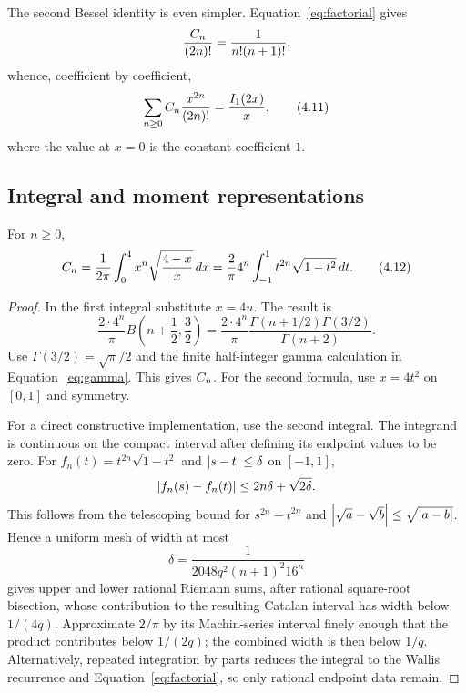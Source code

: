 The second Bessel identity is even simpler.  Equation~\eqref{eq:factorial}
gives
\[
 \frac{C_n}{(2n)!}=\frac1{n!(n+1)!},
\]
whence, coefficient by coefficient,
\[
 \sum_{n\ge0}C_n\frac{x^{2n}}{(2n)!}
 =\frac{I_1(2x)}x,                                                \tag{4.11}\label{eq:even-egf}
\]
where the value at $x=0$ is the constant coefficient $1$.

\subsection{Integral and moment representations}

\begin{theorem}
For $n\ge0$,
\[
 C_n=\frac1{2\pi}\int_0^4 x^n\sqrt{\frac{4-x}{x}}\,dx
 =\frac{2}{\pi}4^n\int_{-1}^{1}t^{2n}\sqrt{1-t^2}\,dt.           \tag{4.12}\label{eq:integrals}
\]
\end{theorem}

\begin{proof}
In the first integral substitute $x=4u$.  The result is
\[
 \frac{2\cdot4^n}{\pi}
 B\left(n+\frac12,\frac32\right)
 =\frac{2\cdot4^n}{\pi}
 \frac{\Gamma(n+1/2)\Gamma(3/2)}{\Gamma(n+2)}.
\]
Use $\Gamma(3/2)=\sqrt\pi/2$ and the finite half-integer gamma calculation in
Equation~\eqref{eq:gamma}.  This gives $C_n$.  For the second formula, use
$x=4t^2$ on $[0,1]$ and symmetry.

For a direct constructive implementation, use the second integral.  The
integrand is continuous on the compact interval after defining its endpoint
values to be zero.  For $f_n(t)=t^{2n}\sqrt{1-t^2}$ and
$\left|s-t\right|\le\delta$ on $[-1,1]$,
\[
 \left|f_n(s)-f_n(t)\right|\le 2n\delta+\sqrt{2\delta}.
\]
This follows from the telescoping bound for $s^{2n}-t^{2n}$ and
$\left|\sqrt a-\sqrt b\right|\le\sqrt{\left|a-b\right|}$.  Hence a uniform mesh of
width at most
\[
 \delta=\frac{1}{2048q^2(n+1)^2 16^n}
\]
gives upper and lower rational Riemann sums, after rational square-root
bisection, whose contribution to the resulting Catalan interval has width
below $1/(4q)$.  Approximate $2/\pi$ by its Machin-series interval finely
enough that the product contributes below $1/(2q)$; the combined width is
then below $1/q$.  Alternatively, repeated integration by parts reduces the integral to the
Wallis recurrence and Equation~\eqref{eq:factorial}, so only rational
endpoint data remain.
\end{proof}

